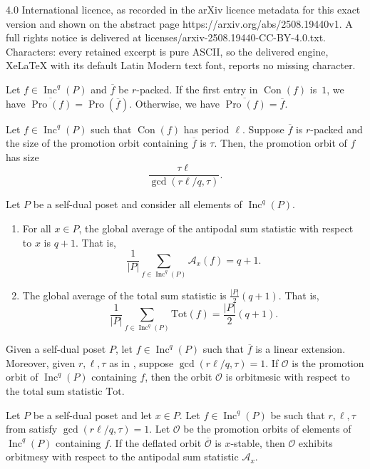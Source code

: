 \documentclass[10pt,a4paper]{amsart}
\DeclareMathOperator{\Con}{\mathrm{Con}}
\DeclareMathOperator{\Inc}{\mathrm{Inc}}
\DeclareMathOperator{\Pro}{\mathrm{Pro}}
\newcommand{\as}{\mathcal{A}}
\newcommand{\tot}{\mathrm{Tot}}
\begin{document}
4.0 International licence, as recorded in the arXiv licence metadata for this exact version and shown on the abstract page https://arxiv.org/abs/2508.19440v1. A full rights notice is delivered at licenses/arxiv-2508.19440-CC-BY-4.0.txt. Characters: every retained excerpt is pure ASCII, so the delivered engine, XeLaTeX with its default Latin Modern text font, reports no missing character.
\begin{proposition}\label{prop:ProRestricts}
Let $f \in \Inc^q(P)$ and $\overline{f}$ be $r$-packed. If the first entry in $\Con(f)$ is~$1$, we have $\overline{\Pro(f)} = \Pro(\overline{f})$. Otherwise, we have $\overline{\Pro(f)} = \overline{f}$.
\end{proposition}

\begin{theorem}\label{thm:OrderComparedToDeflation}
Let $f \in \Inc^q(P)$ such that $\Con(f)$ has period $\ell$. Suppose $\overline{f}$ is $r$-packed and  
the size of the promotion orbit containing $\overline{f}$ is $\tau$. Then, the promotion orbit of $f$ has size \[
\frac{\tau \ell}{\gcd(r\ell/q,\tau)}.
\]
\end{theorem}

\begin{lemma}\label{lem:GlobalAverage}
Let $P$ be a self-dual poset and consider all elements of $\Inc^q(P)$. 
\begin{enumerate}
    \item For all $x \in P$, the global average of the antipodal sum statistic with respect to $x$ is $q+1$. That is, \[
\frac{1}{\vert P\vert}\sum_{f \in \Inc^q(P)} \as_x(f) = q+1.
    \]
    \item The global average of the total sum statistic is $\frac{\vert P \vert}{2} (q+1)$. That is, \[
\frac{1}{\vert P \vert } \sum_{f \in \Inc^q(P)} \tot(f) = \frac{\vert P \vert}{2}(q+1).
    \]
\end{enumerate}
\end{lemma}

\begin{proposition}\label{linear_ext} Given a self-dual poset $P$, let $f \in \Inc^q(P)$ such that $\overline{f}$ is a linear extension. Moreover, given $r,\ell,\tau$ as in , suppose $\gcd(r\ell/q,\tau) = 1$. If $\mathcal{O}$ is the promotion orbit of $\Inc^q(P)$ containing $f$, then the orbit $\mathcal{O}$ is orbitmesic with respect to the total sum statistic $\tot$.
\end{proposition}

\begin{proposition}\label{prop:Stable}
Let $P$ be a self-dual poset and let $x \in P$. Let $f \in \Inc^q(P)$ be such that $r,\ell,\tau$ from  satisfy $\gcd(r\ell/q,\tau) = 1$. Let $\mathcal{O}$ be the promotion orbits of elements of $\Inc^q(P)$ containing $f$. If the deflated orbit $\overline{\mathcal{O}}$ is $x$-stable, then $\mathcal{O}$ exhibits orbitmesy with respect to the antipodal sum statistic $\mathcal{A}_x$. 
\end{proposition}
\end{document}
